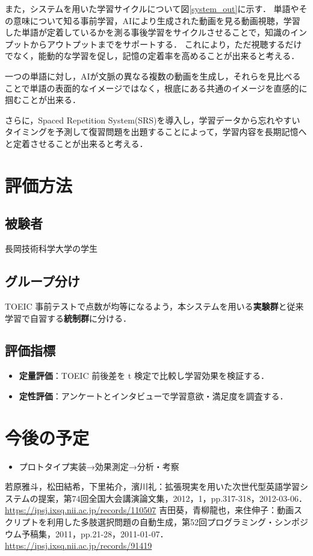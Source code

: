 \documentclass[titlepage,a4paper]{jsarticle}
\begin{document}
また，システムを用いた学習サイクルについて図\ref{system_out}に示す．
単語やその意味について知る事前学習，AIにより生成された動画を見る動画視聴，学習した単語が定着しているかを測る事後学習をサイクルさせることで，知識のインプットからアウトプットまでをサポートする．
これにより，ただ視聴するだけでなく，能動的な学習を促し，記憶の定着率を高めることが出来ると考える．

一つの単語に対し，AIが文脈の異なる複数の動画を生成し，それらを見比べることで単語の表面的なイメージではなく，根底にある共通のイメージを直感的に掴むことが出来る．

さらに，Spaced Repetition System(SRS)を導入し，学習データから忘れやすいタイミングを予測して復習問題を出題することによって，学習内容を長期記憶へと定着させることが出来ると考える．

\section{評価方法}
\subsection*{被験者}
長岡技術科学大学の学生
\subsection*{グループ分け}
TOEIC 事前テストで点数が均等になるよう，本システムを用いる\textbf{実験群}と従来学習で自習する\textbf{統制群}に分ける．

\subsection*{評価指標}
\begin{itemize}
  \item \textbf{定量評価}：TOEIC 前後差を t 検定で比較し学習効果を検証する．
  \item \textbf{定性評価}：アンケートとインタビューで学習意欲・満足度を調査する．
\end{itemize}
\section{今後の予定}
\begin{itemize}
  \item プロトタイプ実装→効果測定→分析・考察
\end{itemize}


\begin{thebibliography}{99}
若原雅斗，松田結希，下里祐介，濱川礼：拡張現実を用いた次世代型英語学習システムの提案，第74回全国大会講演論文集，2012，1，pp.317-318，2012-03-06．
\url{https://ipsj.ixsq.nii.ac.jp/records/110507}
\bibitem{}吉田葵，青柳龍也，来住伸子：動画スクリプトを利用した多肢選択問題の自動生成，第52回プログラミング・シンポジウム予稿集，2011，pp.21-28，2011-01-07．
\url{https://ipsj.ixsq.nii.ac.jp/records/91419}
\end{thebibliography}
\end{document}
